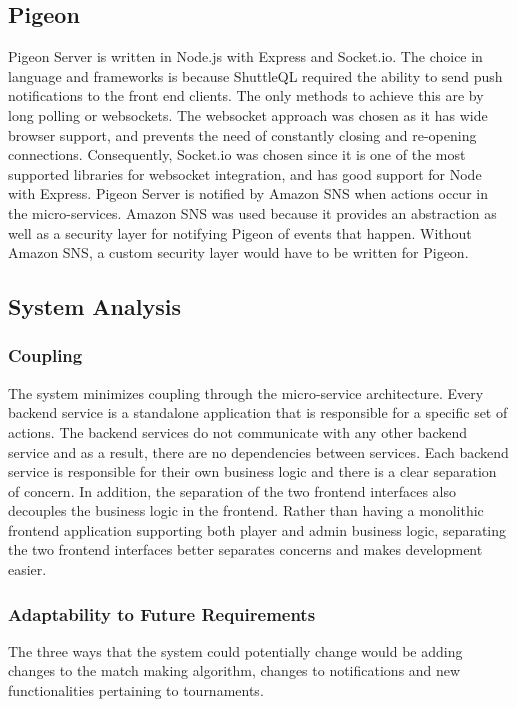 \documentclass{article}
\begin{document}
\subsection{Pigeon}
Pigeon Server is written in Node.js with Express and Socket.io. The choice in language and frameworks is because ShuttleQL required the ability to send push notifications to the front end clients. The only methods to achieve this are by long polling or websockets. The websocket approach was chosen as it has wide browser support, and prevents the need of constantly closing and re-opening connections. Consequently, Socket.io was chosen since it is one of the most supported libraries for websocket integration, and has good support for Node with Express. Pigeon Server is notified by Amazon SNS when actions occur in the micro-services. Amazon SNS was used because it provides an abstraction as well as a security layer for notifying Pigeon of events that happen. Without Amazon SNS, a custom security layer would have to be written for Pigeon.

\subsection{System Analysis}

\subsubsection{Coupling}
The system minimizes coupling through the micro-service architecture. Every backend service is a standalone application that is responsible for a specific set of actions. The backend services do not communicate with any other backend service and as a result, there are no dependencies between services. Each backend service is responsible for their own business logic and there is a clear separation of concern. In addition, the separation of the two frontend interfaces also decouples the business logic in the frontend. Rather than having a monolithic frontend application supporting both player and admin business logic, separating the two frontend interfaces better separates concerns and makes development easier.

\subsubsection{Adaptability to Future Requirements}
The three ways that the system could potentially change would be adding changes to the match making algorithm, changes to notifications and new functionalities pertaining to tournaments.
\end{document}
